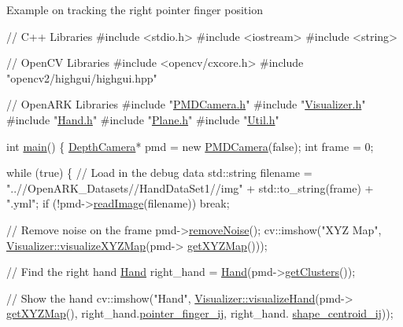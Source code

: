 Example on tracking the right pointer finger position 
\begin{DoxyCodeInclude}
\textcolor{comment}{// C++ Libraries}
\textcolor{preprocessor}{#include <stdio.h>}
\textcolor{preprocessor}{#include <iostream>}
\textcolor{preprocessor}{#include <string>}

\textcolor{comment}{// OpenCV Libraries}
\textcolor{preprocessor}{#include <opencv/cxcore.h>}
\textcolor{preprocessor}{#include "opencv2/highgui/highgui.hpp"}

\textcolor{comment}{// OpenARK Libraries}
\textcolor{preprocessor}{#include "\hyperlink{_p_m_d_camera_8h}{PMDCamera.h}"}
\textcolor{preprocessor}{#include "\hyperlink{_visualizer_8h}{Visualizer.h}"}
\textcolor{preprocessor}{#include "\hyperlink{_hand_8h}{Hand.h}"}
\textcolor{preprocessor}{#include "\hyperlink{_plane_8h}{Plane.h}"}
\textcolor{preprocessor}{#include "\hyperlink{_util_8h}{Util.h}"}

\textcolor{keywordtype}{int} \hyperlink{main_8cpp_ae66f6b31b5ad750f1fe042a706a4e3d4}{main}() \{
    \hyperlink{class_depth_camera}{DepthCamera}* pmd = \textcolor{keyword}{new} \hyperlink{class_p_m_d_camera}{PMDCamera}(\textcolor{keyword}{false});
    \textcolor{keywordtype}{int} frame = 0;
    
    \textcolor{keywordflow}{while} (\textcolor{keyword}{true})
    \{
        \textcolor{comment}{// Load in the debug data}
        std::string filename = \textcolor{stringliteral}{"..//OpenARK\_Datasets//HandDataSet1//img"} + std::to\_string(frame) + \textcolor{stringliteral}{".yml"};
        \textcolor{keywordflow}{if} (!pmd->\hyperlink{class_depth_camera_a21cf887a447d2cdfda6ac907662c55fe}{readImage}(filename))
            \textcolor{keywordflow}{break};
        
        \textcolor{comment}{// Remove noise on the frame}
        pmd->\hyperlink{class_depth_camera_adc06db6509cc5f47de1e168f56bf41fa}{removeNoise}();
        cv::imshow(\textcolor{stringliteral}{"XYZ Map"}, \hyperlink{class_visualizer_a24caf117be9878e2f5ad35cabb7f4f88}{Visualizer::visualizeXYZMap}(pmd->
      \hyperlink{class_depth_camera_a0c295c5a0696550f453b1c8cd0fcb188}{getXYZMap}()));
        
        \textcolor{comment}{// Find the right hand}
        \hyperlink{class_hand}{Hand} right\_hand = \hyperlink{class_hand_a77bc39dbcb8eee3927dd326b22bd3ae7}{Hand}(pmd->\hyperlink{class_depth_camera_a18d88b8df2a08c9c167207fea587d66e}{getClusters}());
        
        \textcolor{comment}{// Show the hand}
        cv::imshow(\textcolor{stringliteral}{"Hand"}, \hyperlink{class_visualizer_aa4436945eb7f9220b55d46914e8c5005}{Visualizer::visualizeHand}(pmd->
      \hyperlink{class_depth_camera_a0c295c5a0696550f453b1c8cd0fcb188}{getXYZMap}(), right\_hand.\hyperlink{class_hand_a7a7147d586c8fc8f781be0ed0dac1d94}{pointer\_finger\_ij}, right\_hand.
      \hyperlink{class_hand_a86d74ccce4bbfafa5825762713d38b44}{shape\_centroid\_ij}));
        


\end{DoxyCodeInclude}
